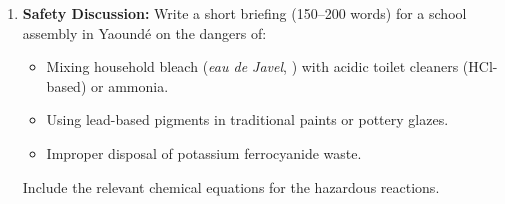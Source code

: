 \documentclass[11pt]{article}
\newcounter{popsec}
\newcounter{popsub}
\newcommand{\courssub}[1]{%
  \stepcounter{popsub}%
  \par\vspace{9pt}\noindent{\popxbold\fontsize{11.5}{13}\selectfont\color{popink}{\color{poporange}\thepopsec.\thepopsub}\hspace{6pt}#1}\par\nopagebreak\vspace{4pt}
}
\begin{document}
\begin{enumerate}
        \begin{quote}
        \textit{Hypothetical Observations:}
        \begin{itemize}
            \item \textbf{Solid A:} Dissolves in water. Gives white ppt with /, soluble in dilute . With conc. , evolves colourless acidic gas (fumes in air), no colour change.
            \item \textbf{Solid B:} Dissolves in water. Gives cream ppt with /, soluble in conc.  but not dilute. With conc. , evolves brown/orange fumes and a gas that bleaches damp litmus.
            \item \textbf{Solid C:} Sparingly soluble in cold water, soluble in hot water. Gives white ppt with /, insoluble in . With conc. , no gas evolution, dissolves on heating.
            \item \textbf{Solid D:} Dissolves in water. No ppt with /. With conc. , no visible reaction. Adding  solution gives a deep blue precipitate (Prussian blue).
            \item \textbf{Solution E:} Pale green. With  (dropwise): dirty green ppt, insoluble in excess, turns brown on standing. With  (dropwise): same dirty green ppt, insoluble in excess. Acidified solution +  gives a deep blue ppt.
        \end{itemize}
        \end{quote}
    \item \textbf{Safety Discussion:} Write a short briefing (150–200 words) for a school assembly in Yaoundé on the dangers of:
        \begin{itemize}
            \item Mixing household bleach (\emph{eau de Javel}, ) with acidic toilet cleaners (HCl-based) or ammonia.
            \item Using lead-based pigments in traditional paints or pottery glazes.
            \item Improper disposal of potassium ferrocyanide waste.
        \end{itemize}
        Include the relevant chemical equations for the hazardous reactions.
\end{enumerate}

\courssub{Model Answer}
\end{document}
